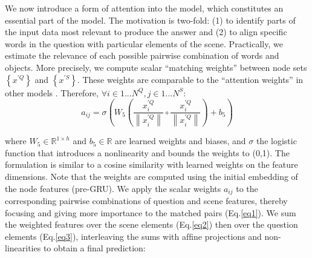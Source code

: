 \documentclass[10pt,twocolumn,a4paper]{article}
\begin{document}
  We now introduce a form of attention into the model,
  which constitutes an essential part of the model. The motivation is two-fold:
  (1) to identify parts of the input data most relevant to produce the answer
  and (2) to align speciﬁc words in the question with particular elements of the scene.
  Practically, we estimate the relevance of each possible pairwise combination of words and objects.
   More precisely, we compute scalar “matching weights” between node sets $\left \{ x^{'Q} \right \}$ and $\left \{ x^{'S} \right \}$.
   These weights are comparable to the “attention weights” in other models \cite{c3}.
   Therefore, $\forall i \in 1...N^Q,j\in 1...N^S$:
   \begin{equation}
    a_{ij}=\sigma \left(W_5\left ( \frac{x_i^{'Q}}{\left \| x_i^{'Q} \right \|} \circ \frac{x_i^{'Q}}{\left \| x_i^{'Q} \right \|} \right) + b_5\right)
   \end{equation}

   where $W_5 \in \mathbb{R}^{1\times h}$ and $b_5 \in \mathbb{R}$ are learned weights and biases,
   and $\sigma$ the logistic function that introduces a nonlinearity and bounds the weights to (0,1).
   The formulation is similar to a cosine similarity with learned weights on the feature dimensions.
    Note that the weights are computed using the initial embedding of the node features (pre-GRU).
    We apply the scalar weights $a_{ij}$ to the corresponding pairwise combinations of question and
    scene features, thereby focusing and giving more importance to the matched pairs (Eq.\ref{eq1}).
     We sum the weighted features over the scene elements (Eq.\ref{eq2}) then over the question elements (Eq.\ref{eq3}),
  interleaving the sums with afﬁne projections and non-linearities to obtain a ﬁnal prediction:
\end{document}
